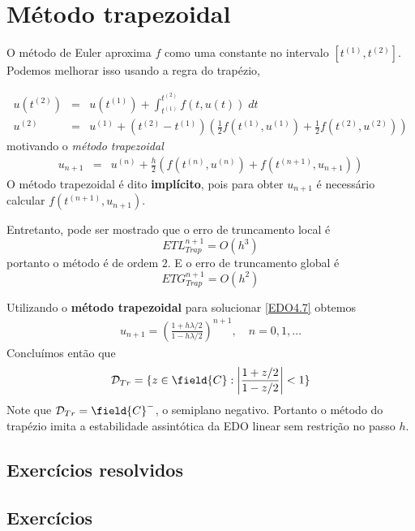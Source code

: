 \section{Método trapezoidal}
O método de Euler aproxima $f$ como uma constante no intervalo $[t^{(1)},t^{(2)}]$. Podemos melhorar isso usando a regra do trapézio,

\begin{eqnarray}
  u(t^{(2)}) &=& u(t^{(1)}) +  \int _{t^{(1)}}^{t^{(2)}}  f(t,u(t)) \; dt \\
  u^{(2)}    &=&   u^{(1)}  +  (t^{(2)}-t^{(1)})\left(\frac{1}{2}f(t^{(1)},u^{(1)})+\frac{1}{2}f(t^{(2)},u^{(2)})\right)
\end{eqnarray}
motivando o \emph{método trapezoidal}
\begin{eqnarray}
  u_{n+1} &=& u^{(n)} +  \frac{h}{2} \left(f(t^{(n)},u^{(n)})+f(t^{(n+1)},u_{n+1})\right)
\end{eqnarray}
O método trapezoidal é dito \textbf{implícito}, pois para obter $u_{n+1}$ é necessário calcular $f(t^{(n+1)},u_{n+1})$.

Entretanto, pode ser mostrado que o erro de truncamento local é
$$ETL_{Trap}^{n+1}= O(h^3)$$
portanto o método é de ordem $2$. E o erro de truncamento global é
$$ETG_{Trap}^{n+1}= O(h^2)$$


\begin{ex}
Utilizando o \textbf{método trapezoidal} para solucionar \eqref{EDO4.7} obtemos
\begin{eqnarray}
 u_{n+1} = \left(\frac{1+ h\lambda /2}{1- h\lambda /2}\right)^{n+1}, \quad  n=0,1,\ldots
\end{eqnarray}
Concluímos então que
\begin{eqnarray}
 \mathcal D_{Tr} = \{z \in  \field{C}:  \left|\frac{1+ z/2}{1- z/2}\right|<1\}
\end{eqnarray}
Note que $\mathcal D_{Tr}=\field{C}^-$, o semiplano negativo. Portanto o método do trapézio imita a estabilidade assintótica da EDO linear sem restrição no passo $h$.
\end{ex}



\subsection*{Exercícios resolvidos}

\emconstrucao

\subsection*{Exercícios}


